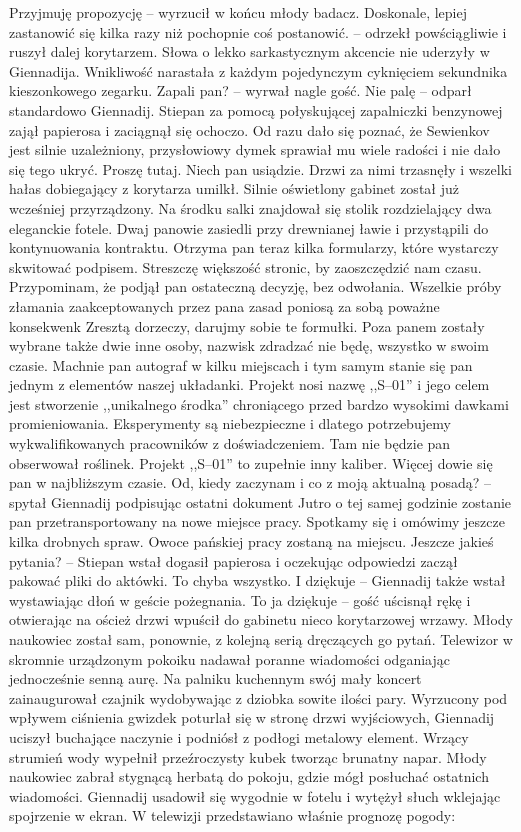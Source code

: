\documentclass[../MAIN.tex]{subfiles}
\begin{document}
% 
\sx Przyjmuję propozycję -- wyrzucił w końcu młody badacz. 
\xx Doskonale, lepiej zastanowić się kilka razy niż pochopnie coś postanowić. -- odrzekł powściągliwie i ruszył dalej korytarzem.
\qd
Słowa o lekko sarkastycznym akcencie nie uderzyły w Giennadija. Wnikliwość narastała z każdym pojedynczym cyknięciem sekundnika kieszonkowego zegarku. 
% 
\sx Zapali pan? -- wyrwał nagle gość. 
\xx Nie palę -- odparł standardowo Giennadij. 
\qd
Stiepan za pomocą połyskującej zapalniczki benzynowej zajął papierosa i zaciągnął się ochoczo. Od razu dało się poznać, że Sewienkov jest silnie uzależniony, przysłowiowy dymek sprawiał mu wiele radości i nie dało się tego ukryć. 
% 
\sx Proszę tutaj. Niech pan usiądzie.
\qd
Drzwi za nimi trzasnęły i wszelki hałas dobiegający z korytarza umilkł. Silnie oświetlony gabinet został już wcześniej przyrządzony. Na środku salki znajdował się stolik rozdzielający dwa eleganckie fotele. Dwaj panowie zasiedli przy drewnianej ławie i przystąpili do kontynuowania kontraktu. 
% 
\sx Otrzyma pan teraz kilka formularzy, które wystarczy skwitować podpisem. Streszczę większość stronic, by zaoszczędzić nam czasu. Przypominam, że podjął pan ostateczną decyzję, bez odwołania. Wszelkie próby złamania zaakceptowanych przez pana zasad poniosą za sobą poważne konsekwen\3k Zresztą dorzeczy, darujmy sobie te formułki. Poza panem zostały wybrane także dwie inne osoby, nazwisk zdradzać nie będę, wszystko w swoim czasie. Machnie pan autograf w kilku miejscach i tym samym stanie się pan jednym z elementów naszej układanki. Projekt nosi nazwę ,,S--01'' i jego celem jest stworzenie ,,unikalnego środka'' chroniącego przed bardzo wysokimi dawkami promieniowania. Eksperymenty są niebezpieczne i dlatego potrzebujemy wykwalifikowanych pracowników z doświadczeniem. Tam nie będzie pan obserwował roślinek. Projekt ,,S--01'' to zupełnie inny kaliber. Więcej dowie się pan w najbliższym czasie. 
\xx Od, kiedy zaczynam i co z moją aktualną posadą? -- spytał Giennadij podpisując ostatni dokument 
\xx Jutro o tej samej godzinie zostanie pan przetransportowany na nowe miejsce pracy. Spotkamy się i omówimy jeszcze kilka drobnych spraw. Owoce pańskiej pracy zostaną na miejscu. Jeszcze jakieś pytania? -- Stiepan wstał dogasił papierosa i oczekując odpowiedzi zaczął pakować pliki do aktówki. 
\xx To chyba wszystko. I dziękuje -- Giennadij także wstał wystawiając dłoń w geście pożegnania. 
\xx To ja dziękuje -- gość uścisnął rękę i otwierając na oścież drzwi wpuścił do gabinetu nieco korytarzowej wrzawy.
\qd
Młody naukowiec został sam, ponownie, z kolejną serią dręczących go pytań.
% 
% 
Telewizor w skromnie urządzonym pokoiku nadawał poranne wiadomości odganiając jednocześnie senną aurę. Na palniku kuchennym swój mały koncert zainaugurował czajnik wydobywając z dziobka sowite ilości pary. Wyrzucony pod wpływem ciśnienia gwizdek poturlał się w stronę drzwi wyjściowych, Giennadij uciszył buchające naczynie i podniósł z podłogi metalowy element. Wrzący strumień wody wypełnił przeźroczysty kubek tworząc brunatny napar. Młody naukowiec zabrał stygnącą herbatą do pokoju, gdzie mógł posłuchać ostatnich wiadomości. Giennadij usadowił się wygodnie w fotelu i wytężył słuch wklejając spojrzenie w ekran. W telewizji przedstawiano właśnie prognozę pogody: 
\end{document}
